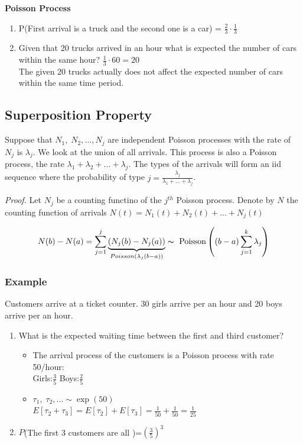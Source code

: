 \documentclass[12pt]{article}
\begin{document}
\begin{section}{\bf Poisson Process}
\begin{enumerate}[label=(\alph*)]
\begin{itemize}
    \end{itemize}

    \item P(First arrival is a truck and the second one is a car) = $\frac{2}{3}\cdot \frac{1}{3}$
    \item Given that 20 trucks arrived in an hour what is expected the number of cars within the same hour? $\frac{1}{3}\cdot 60 = 20$\\
    
    The given 20 trucks actually does not affect the expected number of cars within the same time period.
\end{enumerate}

\subsection{Superposition Property}

Suppose that $N_1,\;N_2,\ldots,N_j$ are independent Poisson processes with the rate of $N_j$ is $\lambda_j$. We look at the union of all arrivals. This process is also a Poisson process, the rate $\lambda_1+\lambda_2+\ldots+\lambda_j$. The types of the arrivals will form an iid sequence where the probability of type $j = \frac{\lambda_j}{\lambda_1+\ldots+\lambda_j}$.

\vspace{1\baselineskip}
{\sl Proof.} Let $N_j$ be a counting functino of the $j^{th}$ Poisson process. Denote by $N$ the counting function of arrivals $N(t)=N_1(t)+N_2(t)+\ldots+N_j(t)$

$$N(b)-N(a)=\sum\limits_{j=1}^j \underbrace{(N_j(b)-N_j(a))}_{Poisson(\lambda_j(b-a))} \thicksim \text{ Poisson} \left((b-a)\sum\limits_{j=1}^k\lambda_j \right)$$


\subsubsection{Example}
Customers arrive at a ticket counter. 30 girls arrive per an hour and 20 boys arrive per an hour.
\begin{enumerate}[label=(\alph*)]
    \item What is the expected waiting time between the first and third customer?
    \begin{itemize}
        \item The arrival process of the customers is a Poisson process with rate 50/hour:\\
        Girls:$\frac{3}{5}$ Boys:$\frac{2}{5}$
        \item $\tau_1,\;\tau_2,\ldots \sim \exp(50)$\\
        $E[\tau_2+\tau_3] = E[\tau_2]+E[\tau_3] = \frac{1}{50}+\frac{1}{50} = \frac{1}{25}$
    \end{itemize}
    \item $P$(The first 3 customers are all )=$\left(\frac{3}{5}\right)^3$
\end{enumerate}


\end{section}
\end{document}
